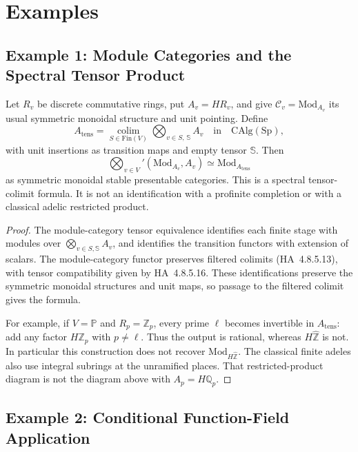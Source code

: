 \section{Examples}
\label{v4-arith:tate:examples}

\subsection{Example 1: Module Categories and the Spectral Tensor Product}

\begin{example}
\label{v4-arith:tate:ex:discrete-recover}
Let \(R_v\) be discrete commutative rings, put \(A_v=H R_v\),
and give \(\mathcal C_v=\mathrm{Mod}_{A_v}\) its usual symmetric
monoidal structure and unit pointing. Define
\[
 A_{\mathrm{tens}}=
 \operatorname*{colim}_{S\in\mathrm{Fin}(V)}
       \bigotimes_{v\in S,\,\mathbb S} A_v
 \quad\text{in}\quad\mathrm{CAlg}(\mathrm{Sp}),
\]
with unit insertions as transition maps and empty tensor
\(\mathbb S\). Then
\[
 \bigotimes_{v\in V}'(\mathrm{Mod}_{A_v},A_v)
       \simeq\mathrm{Mod}_{A_{\mathrm{tens}}}
\]
as symmetric monoidal stable presentable categories.
This is a spectral tensor-colimit formula. It is not an
identification with a profinite completion or with a classical
adelic restricted product.
\end{example}

\begin{proof}
The module-category tensor equivalence identifies each finite
stage with modules over \(\bigotimes_{v\in S,\mathbb S}A_v\),
and identifies the transition functors with extension of scalars.
The module-category functor preserves filtered colimits
(HA~4.8.5.13), with tensor compatibility given by HA~4.8.5.16.
These identifications preserve the symmetric monoidal structures
and unit maps, so passage to the filtered colimit gives the formula.

For example, if \(V=\mathbb P\) and \(R_p=\mathbb Z_p\), every
prime \(\ell\) becomes invertible in \(A_{\mathrm{tens}}\): add
any factor \(H\mathbb Z_p\) with \(p\ne\ell\). Thus the output
is rational, whereas \(H\widehat{\mathbb Z}\) is not. In
particular this construction does not recover
\(\mathrm{Mod}_{H\widehat{\mathbb Z}}\). The classical finite
adeles also use integral subrings at the unramified places.
That restricted-product diagram is not the diagram above with
\(A_p=H\mathbb Q_p\).
\end{proof}

\subsection{Example 2: Conditional Function-Field Application}

